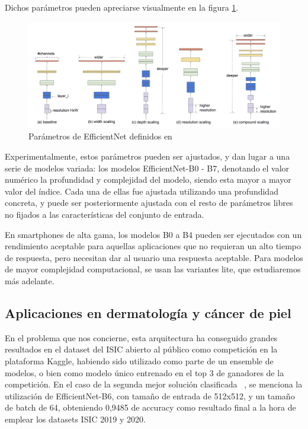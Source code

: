 Dichos parámetros pueden apreciarse visualmente en la figura \ref{fig:paramsefnet}.

\begin{figure}[H]
	\centering
	\includegraphics[scale = 0.2]{imagenes/efnet_scale.png}
	\caption{Parámetros de EfficientNet definidos en~\cite{Chaturvedi_2020}}
	\label{fig:paramsefnet}
\end{figure}


Experimentalmente, estos parámetros pueden ser ajustados, y dan lugar a una serie de modelos variada: los modelos EfficientNet-B0 - B7, denotando el valor numérico la profundidad y complejidad del modelo, siendo esta mayor a mayor valor del índice. Cada una de ellas fue ajustada utilizando una profundidad concreta, y puede ser posteriormente ajustada con el resto de parámetros libres no fijados a las características del conjunto de entrada.

En smartphones de alta gama, los modelos B0 a B4 pueden ser ejecutados con un rendimiento aceptable para aquellas aplicaciones que no requieran un alto tiempo de respuesta, pero necesitan dar al usuario una respuesta aceptable. Para modelos de mayor complejidad computacional, se usan las variantes lite, que estudiaremos más adelante.


\subsection{Aplicaciones en dermatología y cáncer de piel}

En el problema que nos concierne, esta arquitectura ha conseguido grandes resultados en el dataset del ISIC abierto al público como competición en la plataforma Kaggle, habiendo sido utilizado como parte de un ensemble de modelos, o bien como modelo único entrenado en el top 3 de ganadores de la competición. En el caso de la segunda mejor solución clasificada ~\cite{2ndISIC}, se menciona la utilización de EfficientNet-B6, con tamaño de entrada de 512x512, y un tamaño de batch de 64, obteniendo 0,9485 de accuracy como resultado final a la hora de emplear los datasets ISIC 2019 y 2020.


